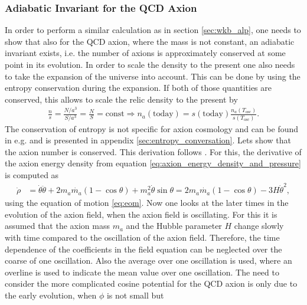\documentclass[twoside,a4paper, 12pt]{article}
\numberwithin{equation}{section}
\begin{document}
\subsubsection{Adiabatic Invariant for the QCD Axion}
In order to perform a similar calculation as in section
\ref{sec:wkb_alp},
one needs to show that
also for the QCD axion, where the mass is not constant, an adiabatic invariant exists,
i.e. the number of axions is approximately conserved at some point
in its evolution. In order to scale the density to the present one also needs to take
the expansion of the universe into account. This can be done
by using the entropy conservation during the expansion.
If both of those quantities are conserved,
this allows to scale the relic density to the present by
\begin{align}
    \label{eq:n_over_s}
    \frac{n}{s} = \frac{N / a^3}{S / a^3} = \frac{N}{S} = \mathrm{const}
    \Rightarrow n_a(\mathrm{today}) = s(\mathrm{today}) \frac{n_a(T_\mathrm{osc})}{s(T_\mathrm{osc})}.
\end{align}
The conservation of entropy is not specific 
for axion cosmology and can be found in e.g. \cite{TheEarlyUniverseKolbAndTurner} and is presented in
appendix \ref{sec:entropy_conversation}.
Lets show that the axion number is conserved.
This derivation follows \cite[Sec. IV, Eq. 28]{AxionCosmoRev}.
For this, the derivative of the axion energy density from equation \eqref{eq:axion_energy_density_and_pressure} is computed as
\begin{align*}
    \dot{\rho} &= \dot{\theta} \ddot{\theta} + 2 m_a \dot{m_a} (1 - \cos \theta) + m_a^2 \dot{\theta} \sin \theta
    = 2 m_a \dot{m_a} (1 - \cos \theta) - 3 H \dot{\theta}^2,
\end{align*}
using the equation of motion \eqref{eq:eom}.
Now one looks at the later times in the evolution of the axion field, when the axion field
is oscillating.
For this it is assumed
that the axion mass $m_a$ and the Hubble parameter $H$ change slowly with time compared to the oscillation of the axion field. Therefore, the time dependence of the coefficients
in the field equation can be neglected over the coarse of one oscillation.
Also the average over one oscillation is used, where an overline
is used to indicate the mean value over one oscillation.
The need to consider the more complicated cosine potential for the QCD axion is
only due to the early evolution, when $\phi$ is not small but
\end{document}
